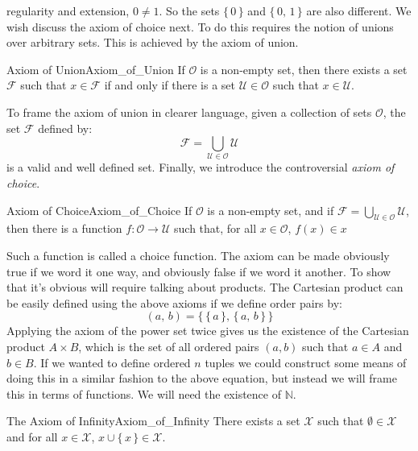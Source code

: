 \documentclass[crop=false,class=article]{standalone}                           %
\begin{document}
        regularity and extension, $0\ne{1}$. So the sets $\{\,0\,\}$ and
        $\{\,0,\,1\,\}$ are also different. We wish discuss the axiom of choice
        next. To do this requires the notion of unions over arbitrary sets.
        This is achieved by the axiom of union.
        \begin{faxiom}{Axiom of Union}{Axiom_of_Union}
            If $\mathcal{O}$ is a non-empty set, then there exists a set
            $\mathcal{F}$ such that $x\in\mathcal{F}$ if and only if there is
            a set $\mathcal{U}\in\mathcal{O}$ such that $x\in\mathcal{U}$.
        \end{faxiom}
        To frame the axiom of union in clearer language, given a collection of
        sets $\mathcal{O}$, the set $\mathcal{F}$ defined by:
        \begin{equation}
            \mathcal{F}=\bigcup_{\mathcal{U}\in\mathcal{O}}\mathcal{U}
        \end{equation}
        is a valid and well defined set. Finally, we introduce the
        controversial \textit{axiom of choice}.
        \begin{faxiom}{Axiom of Choice}{Axiom_of_Choice}
            If $\mathcal{O}$ is a non-empty set, and if
            $\mathcal{F}=\bigcup_{\mathcal{U}\in\mathcal{O}}\mathcal{U}$,
            then there is a function $f:\mathcal{O}\rightarrow\mathcal{U}$ such
            that, for all $x\in\mathcal{O}$, $f(x)\in{x}$
        \end{faxiom}
        Such a function is called a choice function. The axiom can be made
        obviously true if we word it one way, and obviously false if we word it
        another. To show that it's obvious will require talking about products.
        The Cartesian product can be easily defined using the above axioms
        if we define order pairs by:
        \begin{equation}
            (a,\,b)=\{\,\{\,a\,\},\,\{\,a,\,b\,\}\,\}
        \end{equation}
        Applying the axiom of the power set twice gives us the existence
        of the Cartesian product $A\times{B}$, which is the set of all
        ordered pairs $(a,b)$ such that $a\in{A}$ and $b\in{B}$. If we wanted
        to define ordered $n$ tuples we could construct some means of doing
        this in a similar fashion to the above equation, but instead we will
        frame this in terms of functions. We will need the existence of
        $\mathbb{N}$.
        \begin{faxiom}{The Axiom of Infinity}{Axiom_of_Infinity}
            There exists a set $\mathcal{X}$ such that $\emptyset\in\mathcal{X}$
            and for all $x\in\mathcal{X}$, $x\cup\{\,x\,\}\in\mathcal{X}$.
        \end{faxiom}
\end{document}
